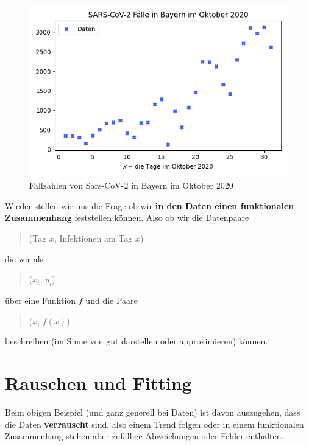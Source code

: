 \documentclass[]{book}
\theoremstyle{definition}
\theoremstyle{definition}
\theoremstyle{definition}
\theoremstyle{definition}
\theoremstyle{remark}
\begin{document}
\begin{figure}
\hypertarget{fig:cases}{%
\centering
\includegraphics{bilder/02-cases.png}
\caption{Fallzahlen von Sars-CoV-2 in Bayern im Oktober
2020}\label{fig:cases}
}
\end{figure}

Wieder stellen wir uns die Frage ob wir \textbf{in den Daten einen funktionalen
Zusammenhang} feststellen können. Also ob wir die Datenpaare

\begin{quote}
(Tag \(x\), Infektionen am Tag \(x\))
\end{quote}

die wir als

\begin{quote}
(\(x_i\), \(y_i\))
\end{quote}

über eine Funktion \(f\) und die Paare

\begin{quote}
(\(x\), \(f(x)\))
\end{quote}

beschreiben (im Sinne von gut darstellen oder approximieren) können.

\hypertarget{rauschen-und-fitting}{%
\section{Rauschen und Fitting}\label{rauschen-und-fitting}}

Beim obigen Beispiel (und ganz generell bei Daten) ist davon auszugehen, dass die Daten \textbf{verrauscht} sind, also einem Trend folgen oder in einem funktionalen Zusammenhang stehen aber zufällige Abweichungen oder Fehler enthalten.
\end{document}
